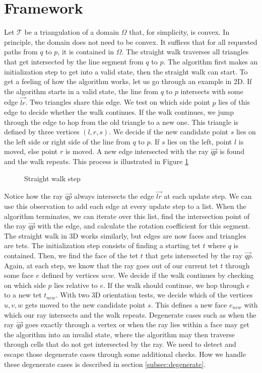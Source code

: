 \documentclass[../thesis.tex]{subfiles}
\begin{document}
\section{Framework}
\label{sec:framework}
Let $\mathcal{T}$ be a triangulation of a domain $\Omega$ that, for simplicity, is convex.
In principle, the domain does not need to be convex. It suffices that for all requested paths from $q$ to $p$,
it is contained in $\Omega$.
The straight walk traverses all triangles that get intersected by the line segment
from $q$ to $p$. The algorithm first makes an initialization step to get into a valid state, 
then the straight walk can start.
To get a feeling of how the algorithm works, let us go through an example in 2D.
If the algorithm starts in a valid state, the line from $q$ to $p$
intersects with some edge $\vec{lr}$. Two triangles share this edge.
We test on which side point $p$ lies of this edge to decide whether the walk continues.
If the walk continues, we jump through the edge to hop from the old triangle to a new one.
This triangle is defined by three vertices $(l,r,s)$. We decide if
the new candidate point $s$ lies on the left side or right side of the line from $q$ to $p$.
If $s$ lies on the left, point $l$ is moved, else point $r$ is moved.
A new edge intersected with the ray $\vec{qp}$ is found and the walk repeats.
This process is illustrated in Figure \ref{fig:straight-walk-2d}
\begin{figure}[htb]
  \centering
  \def\svgwidth{35em}
  
  \caption{Straight walk step}\label{fig:straight-walk-2d}        
\end{figure}
Notice how the ray $\vec{qp}$ always intersects the edge $\vec{lr}$ at each update step.
We can use this observation to add each edge at every update step to a list.
When the algorithm terminates, we can iterate over this list, find
the intersection point of the ray $\vec{qp}$ with the edge, and calculate the rotation
coefficient for this segment.
The straight walk in 3D works similarly, but edges are now faces and triangles are tets. The initialization step consists of finding a starting tet $t$
where $q$ is contained. Then, we find the face of the tet $t$ that gets intersected by the ray
$\vec{qp}$. Again, at each step, we know that the ray goes out of our current tet $t$ through some
face $e$ defined by vertices $uvw$. We decide if the walk continues by checking on which side $p$ lies relative to $e$.
If the walk should continue, we hop through $e$ to a new tet $t_{new}$. With two 3D orientation tests,
we decide which of the vertices $u, v, w$ gets moved to the new candidate point $s$. This defines
a new face $e_{new}$ with which our ray intersects and the walk repeats.
Degenerate cases such as when the ray $\vec{qp}$ goes exactly through a vertex or
when the ray lies within a face may get the algorithm into
an invalid state, where the algorithm may then traverse through
cells that do not get intersected by the ray. We need to detect and escape those degenerate cases
through some additional checks.
How we handle these degenerate cases is described in section \ref{subsec:degenerate}.
\end{document}
